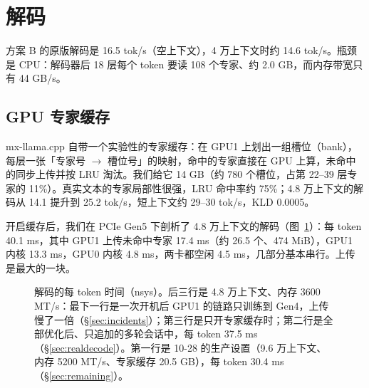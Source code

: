 \documentclass[11pt,a4paper]{article}
\newcommand{\tps}{tok/s}
\begin{document}
\section{解码}
\label{sec:decode}

方案 B 的原版解码是 16.5 \tps{}（空上下文），4 万上下文时约 14.6 \tps{}。瓶颈是 CPU：解码器后 18 层每个 token 要读 108 个专家、约 2.0 GB，而内存带宽只有 44 GB/s。

\subsection{GPU 专家缓存}

mx-llama.cpp 自带一个实验性的专家缓存：在 GPU1 上划出一组槽位（bank），每层一张「专家号 $\to$ 槽位号」的映射，命中的专家直接在 GPU 上算，未命中的同步上传并按 LRU 淘汰。我们给它 14 GB（约 780 个槽位，占第 22--39 层专家的 11\%）。真实文本的专家局部性很强，LRU 命中率约 75\%；4.8 万上下文的解码从 14.1 提升到 25.2 \tps{}，短上下文约 29--30 \tps{}，KLD 0.0005。

开启缓存后，我们在 PCIe Gen5 下剖析了 4.8 万上下文的解码（图~\ref{fig:decode}）：每 token 40.1 ms，其中 GPU1 上传未命中专家 17.4 ms（约 26.5 个、474 MiB），GPU1 内核 13.3 ms，GPU0 内核 4.8 ms，两卡都空闲 4.5 ms，几部分基本串行。上传是最大的一块。

\begin{figure}[t]
  \centering
  \caption{解码的每 token 时间（nsys）。后三行是 4.8 万上下文、内存 3600 MT/s：最下一行是一次开机后 GPU1 的链路只训练到 Gen4，上传慢了一倍（\S\ref{sec:incidents}）；第三行是只开专家缓存时；第二行是全部优化后、只追加的多轮会话中，每 token 37.5 ms（\S\ref{sec:realdecode}）。第一行是 10-28 的生产设置（9.6 万上下文、内存 5200 MT/s、专家缓存 20.5 GB），每 token 30.4 ms（\S\ref{sec:remaining}）。}
  \label{fig:decode}
\end{figure}
\end{document}

